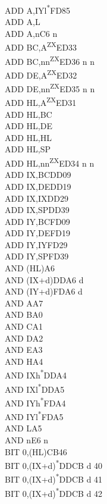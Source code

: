 \documentclass[twoside,openright,a4paper]{book}
\begin{document}
\begin{multicols}{3}
{\begin{tabbing}
	ADD A,IYl\textsuperscript{*}\>FD85\\
	ADD A,L\\
	ADD A,n\>C6 n\\
	ADD BC,A\textsuperscript{ZX}\>ED33\\
	ADD BC,nn\textsuperscript{ZX}\>ED36	n n\\
	ADD DE,A\textsuperscript{ZX}\>ED32\\
	ADD DE,nn\textsuperscript{ZX}\>ED35 n n\\
	ADD HL,A\textsuperscript{ZX}\>ED31\\
	ADD HL,BC\\
	ADD HL,DE\\
	ADD HL,HL\\
	ADD HL,SP\\
	ADD HL,nn\textsuperscript{ZX}\>ED34 n n\\
	ADD IX,BC\>DD09\\
	ADD IX,DE\>DD19\\
	ADD IX,IX\>DD29\\
	ADD IX,SP\>DD39\\
	ADD IY,BC\>FD09\\
	ADD IY,DE\>FD19\\
	ADD IY,IY\>FD29\\
	ADD IY,SP\>FD39\\
	AND (HL)\>A6\\
	AND (IX+d)\>DDA6 d\\
	AND (IY+d)\>FDA6 d\\
	AND A\>A7\\
	AND B\>A0\\
	AND C\>A1\\
	AND D\>A2\\
	AND E\>A3\\
	AND H\>A4\\
	AND IXh\textsuperscript{*}\>DDA4\\
	AND IXl\textsuperscript{*}\>DDA5\\
	AND IYh\textsuperscript{*}\>FDA4\\
	AND IYl\textsuperscript{*}\>FDA5\\
	AND L\>A5\\
	AND n\>E6 n\\
	BIT 0,(HL)\>CB46\\
	BIT 0,(IX+d)\textsuperscript{*}\>DDCB d 40\\
	BIT 0,(IX+d)\textsuperscript{*}\>DDCB d 41\\
	BIT 0,(IX+d)\textsuperscript{*}\>DDCB d 42\\

\end{tabbing}}
\end{multicols}
\end{document}
